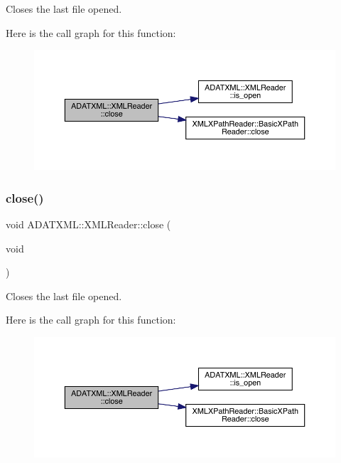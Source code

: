 Closes the last file opened. 

Here is the call graph for this function\+:
\nopagebreak
\begin{figure}[H]
\begin{center}
\leavevmode
\includegraphics[width=350pt]{db/d3f/classADATXML_1_1XMLReader_a0e5f84d85bb03e1ba3c01a20b1642a36_cgraph}
\end{center}
\end{figure}
\mbox{\label{classADATXML_1_1XMLReader_a0e5f84d85bb03e1ba3c01a20b1642a36}} 
\subsubsection{\texorpdfstring{close()}{close()}\hspace{0.1cm}{\footnotesize\ttfamily [3/3]}}
{\footnotesize\ttfamily void A\+D\+A\+T\+X\+M\+L\+::\+X\+M\+L\+Reader\+::close (\begin{DoxyParamCaption}\item[{void}]{ }\end{DoxyParamCaption})\hspace{0.3cm}{\ttfamily [inline]}}



Closes the last file opened. 

Here is the call graph for this function\+:
\nopagebreak
\begin{figure}[H]
\begin{center}
\leavevmode
\includegraphics[width=350pt]{db/d3f/classADATXML_1_1XMLReader_a0e5f84d85bb03e1ba3c01a20b1642a36_cgraph}
\end{center}
\end{figure}
\mbox{\label{classADATXML_1_1XMLReader_a59584913f1338d956de60adef16a0718}} 
